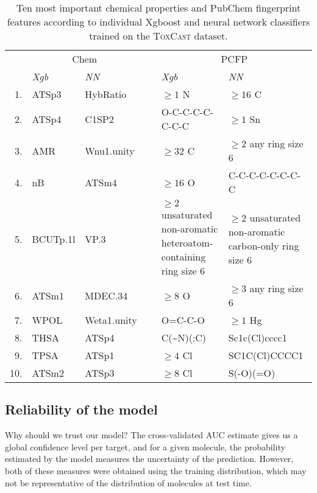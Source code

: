 \documentclass[11pt,a4paper]{article}
\begin{document}
\begin{table}[ht]\small
    \centering
        \begin{tabular}{rp{1.5cm}p{1.5cm}cp{5.1cm}p{5.1cm}}
      \toprule
       ~& \multicolumn{2}{c}{Chem}  & ~ & \multicolumn{2}{c}{PCFP}  \\ 
        \cmidrule(lr){2-3}
        \cmidrule(lr){5-6}
        ~&\multicolumn{1}{l}{\it Xgb} & \multicolumn{1}{l}{\it NN} & ~ & \multicolumn{1}{l}{\it Xgb} & \multicolumn{1}{l}{\it NN} \\ 
      \midrule
      1.& ATSp3 &    HybRatio & ~ &    {$\geq 1$ N} &  $\geq 16$ C \\ 
      2.& ATSp4 &    C1SP2 &  ~ &      O-C-C-C-C-C-C-C &  $\geq 1$ Sn \\ 
      3.& AMR &      Wnu1.unity & ~ &  $\geq 32$ C &   $\geq 2$ any ring size 6 \\ 
      4.& nB &       ATSm4 & ~ &       $\geq 16$ O &   C-C-C-C-C-C-C-C \\ 
      5.& BCUTp.1l & VP.3  & ~ &       $\geq 2$ unsaturated non-aromatic heteroatom-containing ring size 6 &   
                                        $\geq 2$ unsaturated non-aromatic carbon-only ring size 6 \\ 
      6.& ATSm1 &    MDEC.34 &  ~ &    $\geq 8$ O &  $\geq 3$ any ring size 6 \\ 
      7.& WPOL &     Weta1.unity & ~ & O=C-C-O &   $\geq 1$ Hg \\ 
      8.& THSA &     ATSp4 &~ &        C(\~{}N)(:C) &  Sc1c(Cl)cccc1 \\ 
      9.& TPSA &     ATSp1 &~ &        $\geq 4$ Cl &  SC1C(Cl)CCCC1 \\ 
      10.& ATSm2 &   ATSp3 & ~ &       $\geq 8$ Cl &  S(-O)(=O) \\ 
    \bottomrule
    \end{tabular}
    \caption{Ten most important chemical properties and PubChem fingerprint features according 
    to individual Xgboost and neural network classifiers trained on the 
    \textsc{ToxCast} dataset.} 
    \label{tab_toxcast_top10_features}
    \end{table}


\subsection{Reliability of the model}
Why should we trust our model? The cross-validated AUC estimate gives us a global confidence level 
per target, and for a given molecule, the probability estimated by the model measures the 
uncertainty of the prediction. However, both of these measures were obtained using the training 
distribution, which may not be representative of the distribution of molecules at test time.
\end{document}
